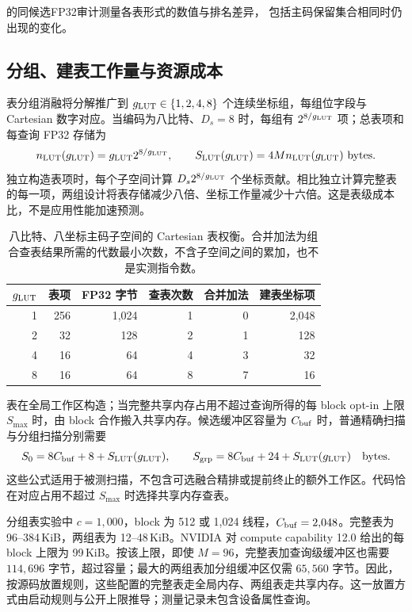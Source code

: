 的同候选FP32审计测量各表形式的数值与排名差异，
包括主码保留集合相同时仍出现的变化。


\subsection{分组、建表工作量与资源成本}

表分组消融将分解推广到 $g_{\mathrm{LUT}}\in\{1,2,4,8\}$ 个连续坐标组，每组位字段与 Cartesian 数字对应。当编码为八比特、$D_s=8$ 时，每组有 $2^{8/g_{\mathrm{LUT}}}$ 项；总表项和每查询 FP32 存储为
\begin{equation}
 n_{\rm LUT}(g_{\mathrm{LUT}})=g_{\mathrm{LUT}} 2^{8/g_{\mathrm{LUT}}},\qquad S_{\rm LUT}(g_{\mathrm{LUT}})=4Mn_{\rm LUT}(g_{\mathrm{LUT}})\ \text{bytes}.
 \label{eq:5-lut-cost}
\end{equation}
独立构造表项时，每个子空间计算 $D_s2^{8/g_{\mathrm{LUT}}}$ 个坐标贡献。相比独立计算完整表的每一项，两组设计将表存储减少八倍、坐标工作量减少十六倍。这是表级成本比，不是应用性能加速预测。

\begin{table}[tbp]
\centering
\caption[笛卡尔查找表的资源权衡]{八比特、八坐标主码子空间的 Cartesian 表权衡。合并加法为组合查表结果所需的代数最小次数，不含子空间之间的累加，也不是实测指令数。}
\label{tab:5-lut-resources}
\small
\begin{tabular}{@{}rrrrrr@{}}
\toprule
$g_{\mathrm{LUT}}$ & 表项 & FP32 字节 & 查表次数 & 合并加法 & 建表坐标项 \\
\midrule
1 & 256 & 1,024 & 1 & 0 & 2,048 \\
2 & 32 & 128 & 2 & 1 & 128 \\
4 & 16 & 64 & 4 & 3 & 32 \\
8 & 16 & 64 & 8 & 7 & 16 \\
\bottomrule
\end{tabular}
\end{table}

表在全局工作区构造；当完整共享内存占用不超过查询所得的每 block opt-in 上限 $S_{\max}$ 时，由 block 合作搬入共享内存。候选缓冲区容量为 $C_{\rm buf}$ 时，普通精确扫描与分组扫描分别需要
\begin{equation}
 S_0=8C_{\rm buf}+8+S_{\rm LUT}(g_{\mathrm{LUT}}),\qquad
 S_{\rm grp}=8C_{\rm buf}+24+S_{\rm LUT}(g_{\mathrm{LUT}})
 \quad\text{bytes}.
 \label{eq:5-shared-footprint}
\end{equation}
这些公式适用于被测扫描，不包含可选融合精排或提前终止的额外工作区。代码恰在对应占用不超过 $S_{\max}$ 时选择共享内存查表。

分组表实验中 $c=1{,}000$，block 为 512 或 1,024 线程，$C_{\rm buf}=2{,}048$。完整表为 96--384\,KiB，两组表为 12--48\,KiB。NVIDIA 对 compute capability 12.0 给出的每 block 上限为 99\,KiB\cite{blackwell_tuning}。按该上限，即使 $M=96$，完整表加查询级缓冲区也需要 $114{,}696$ 字节，超过容量；最大的两组表加分组缓冲区仅需 $65{,}560$ 字节。因此，按源码放置规则，这些配置的完整表走全局内存、两组表走共享内存。这一放置方式由启动规则与公开上限推导；测量记录未包含设备属性查询。

